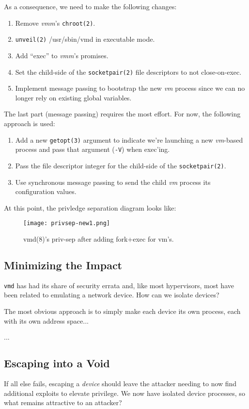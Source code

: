 \documentclass[conference]{IEEEtran}
\begin{document}
As a consequence, we need to make the following changes:

\begin{enumerate}
\item Remove \emph{vmm}'s \texttt{chroot(2)}.
\item \texttt{unveil(2)} /usr/sbin/vmd in executable mode.
\item Add ``exec'' to \emph{vmm}'s promises.
\item Set the child-side of the \texttt{socketpair(2)} file
  descriptors to not close-on-exec.
\item Implement message passing to bootstrap the new \emph{vm} process
  since we can no longer rely on existing global variables.
\end{enumerate}

The last part (message passing) requires the most effort. For now, the
following approach is used:

\begin{enumerate}
\item Add a new \texttt{getopt(3)} argument to indicate we're
  launching a new \emph{vm}-based process and pass that argument
  (\texttt{-V}) when exec'ing.
\item Pass the file descriptor integer for the child-side of the
  \texttt{socketpair(2)}.
\item Use synchronous message passing to send the child \emph{vm}
  process its configuration values.
\end{enumerate}

At this point, the privledge separation diagram looks like:

\begin{figure}
  \texttt{[image: privsep-new1.png]}
  \caption{vmd(8)'s priv-sep after adding fork+exec for vm's.}
\end{figure}

\subsection{Minimizing the Impact}
\texttt{vmd} has had its share of security errata and, like most
hypervisors, most have been related to emulating a network device. How
can we isolate devices?

The most obvious approach is to simply make each device its own
process, each with its own address space...

...

\subsection{Escaping into a Void}
If all else fails, escaping a \emph{device} should leave the attacker
needing to now find additional exploits to elevate privilege. We now
have isolated device processes, so what remains attractive to an
attacker?
\end{document}
